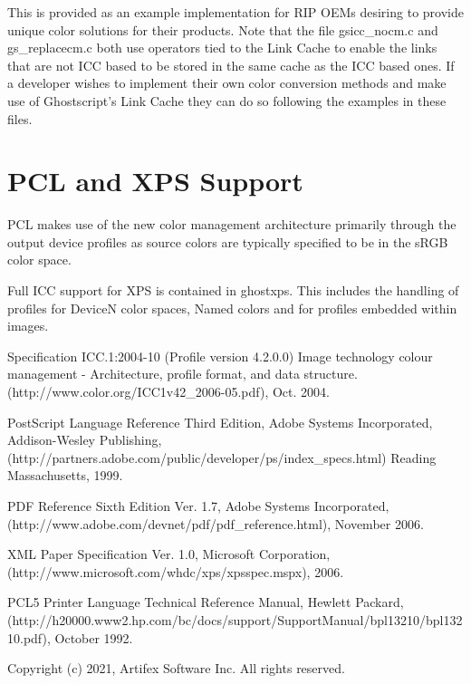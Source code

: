 \documentclass[12pt,notitlepage]{article}
\begin{document}
This is provided as an example implementation for RIP OEMs desiring to provide unique color solutions for their products.
Note that the file gsicc\_nocm.c and gs\_replacecm.c both use operators tied to the Link Cache to enable the links that are not ICC based to be stored in the same cache as the ICC based ones.  If a developer wishes to implement their own color conversion methods and make use of Ghostscript's Link Cache they can do so following the examples in these files.

\section{PCL and XPS Support}

PCL\cite{PCL} makes use of the new color management architecture primarily through the output device profiles as source colors are typically specified to be in the sRGB color space.

Full ICC support for XPS\cite{XPS} is contained in ghostxps. This includes the handling of profiles for DeviceN color spaces, Named colors and for profiles embedded within images.

\begin{thebibliography}{99}

 Specification ICC.1:2004-10 (Profile version 4.2.0.0) Image technology colour management - Architecture, profile format, and data structure.
(http://www.color.org/ICC1v42\_2006-05.pdf), Oct. 2004.

 PostScript Language Reference Third Edition, Adobe Systems Incorporated, Addison-Wesley Publishing, (http://partners.adobe.com/public/developer/ps/index\_specs.html)
Reading Massachusetts, 1999.

 PDF Reference Sixth Edition Ver. 1.7, Adobe Systems Incorporated, (http://www.adobe.com/devnet/pdf/pdf\_reference.html), November 2006.

 XML Paper Specification Ver. 1.0, Microsoft Corporation, (http://www.microsoft.com/whdc/xps/xpsspec.mspx), 2006.

 PCL5 Printer Language Technical Reference Manual, Hewlett Packard, (http://h20000.www2.hp.com/bc/docs/support/SupportManual/bpl13210/bpl13210.pdf), October 1992.

\end{thebibliography}

\vspace*{1.25in}
Copyright (c) 2021, Artifex Software Inc. All rights reserved.
\end{document}
